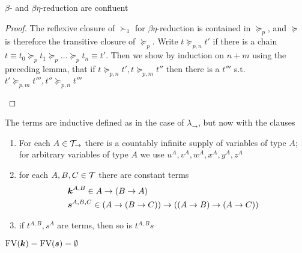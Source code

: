 \documentclass[11pt]{article}
\begin{document}
\begin{theorem}[]
\(\beta\)- and \(\beta \eta\)-reduction are confluent
\end{theorem}
\begin{proof}
The reflexive closure of \(\succ_1\) for \(\beta \eta\)-reduction is contained in
\(\succeq_p\), and \(\succeq\) is therefore the transitive closure of
\(\succeq_p\). Write \(t\succeq_{p,n}t'\) if there is a chain
\(t\equiv t_0\succeq_p t_1\succeq_p\dots\succeq_pt_n\equiv t'\). Then we show
by induction on \(n+m\) using the preceding lemma, that if
\(t\succeq_{p,n}t',t\succeq_{p,m}t''\) then there is a \(t'''\) s.t.
\(t'\succeq_{p,m}t''',t''\succeq_{p,n}t'''\) 
\begin{center}
\end{center}
\end{proof}

\begin{definition}
The terms are inductive defined as in the case of \(\lambda_\to\), but now with
the clauses
\begin{enumerate}
\item For each \(A\in\mathcal{T}_\to\) there is a countably infinite supply of variables
of type \(A\); for arbitrary variables of type \(A\) we use
\(u^A,v^A,w^A,x^A,y^A,z^A\)
\item for each \(A,B,C\in\mathcal{T}\) there are constant terms
\begin{align*}
&\boldsymbol{k}^{A,B}\in A\to(B\to A)\\
&\boldsymbol{s}^{A,B,C}\in (A\to(B\to C))\to((A\to B)\to(A\to C))
\end{align*}
\item if \(t^{A,B},s^A\) are terms, then so is \(t^{A,B}s\)
\end{enumerate}


\(\text{FV}(\boldsymbol{k})=\text{FV}(\boldsymbol{s})=\emptyset\)
\end{definition}
\end{document}
